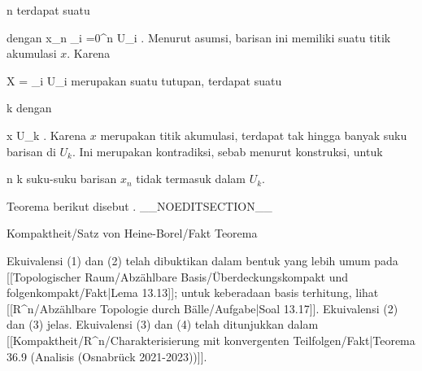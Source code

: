 {{\mavergleichskette
{\vergleichskette
{ n
}
{ \in }{ \N
}
{  }{
}
{    }{
}
{   }{
}
}
{}{}{}
terdapat suatu

 {dengan}
 {x_n \not\in \bigcup_{i =0}^n  U_i} {}
 {} {} {} {.}
Menurut asumsi, barisan ini memiliki suatu titik akumulasi $x$. Karena

\mavergleichskette
{\vergleichskette
{ X
}
{ = }{ \bigcup_{i \in \N} U_i
}
{  }{
}
{    }{
}
{   }{
}
}
{}{}{}
merupakan suatu tutupan, terdapat suatu

\mavergleichskette
{\vergleichskette
{ k
}
{ \in }{ \N
}
{  }{
}
{    }{
}
{   }{
}
}
{}{}{}
dengan

\mavergleichskette
{\vergleichskette
{ x
}
{ \in }{ U_k
}
{  }{
}
{    }{
}
{   }{
}
}
{}{}{.}
Karena $x$ merupakan titik akumulasi, terdapat tak hingga banyak suku barisan di $U_k$. Ini merupakan kontradiksi, sebab menurut konstruksi, untuk

\mavergleichskette
{\vergleichskette
{ n
}
{ \geq }{ k
}
{  }{
}
{    }{
}
{   }{
}
}
{}{}{}
suku-suku barisan $x_n$ tidak termasuk dalam $U_k$.}
{}

}

Teorema berikut disebut  {.}
__NOEDITSECTION__

{Kompaktheit/Satz von Heine-Borel/Fakt}
{Teorema}
{}
{

\faktzusatz {}
\faktzusatz {}

}
{

\teilbeweis {}{}{}
{Ekuivalensi (1) dan (2) telah dibuktikan dalam bentuk yang lebih umum pada
[[Topologischer Raum/Abzählbare Basis/Überdeckungskompakt und folgenkompakt/Fakt|Lema 13.13]];
untuk keberadaan basis terhitung, lihat
[[R^n/Abzählbare Topologie durch Bälle/Aufgabe|Soal 13.17]].}
{}
\teilbeweis {}{}{}
{Ekuivalensi (2) dan (3) jelas.}
{}
\teilbeweis {}{}{}
{Ekuivalensi (3) dan (4) telah ditunjukkan dalam
[[Kompaktheit/R^n/Charakterisierung mit konvergenten Teilfolgen/Fakt|Teorema 36.9 (Analisis (Osnabrück 2021-2023))]].}
{}

}

